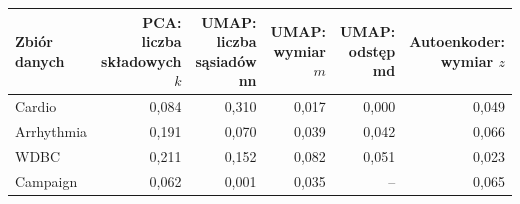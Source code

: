 \begin{tabular}{lrrrrr}
\toprule
Zbiór danych & \makecell[r]{PCA:\\liczba składowych $k$} & \makecell[r]{UMAP:\\liczba sąsiadów nn} & \makecell[r]{UMAP:\\wymiar $m$} & \makecell[r]{UMAP:\\odstęp md} & \makecell[r]{Autoenkoder:\\wymiar $z$} \\
\midrule
Cardio & 0,084 & 0,310 & 0,017 & 0,000 & 0,049 \\
Arrhythmia & 0,191 & 0,070 & 0,039 & 0,042 & 0,066 \\
WDBC & 0,211 & 0,152 & 0,082 & 0,051 & 0,023 \\
Campaign & 0,062 & 0,001 & 0,035 & -- & 0,065 \\
\bottomrule
\end{tabular}
